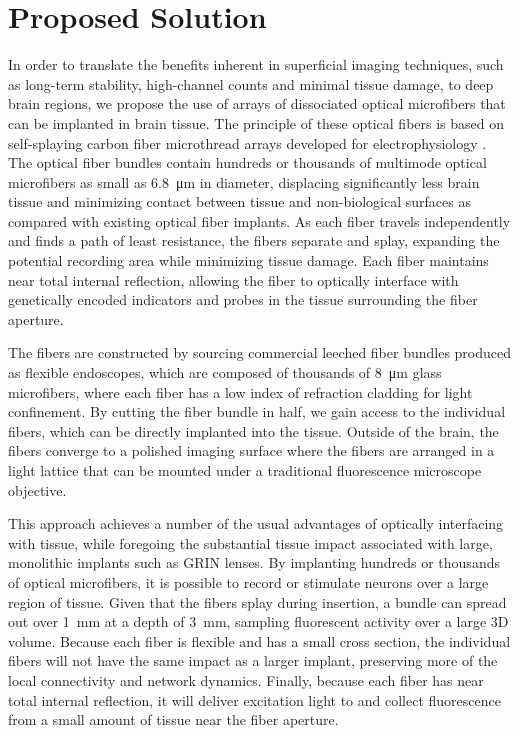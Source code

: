 \section{Proposed Solution}

In order to translate the benefits inherent in superficial 
imaging techniques, such as long-term stability, high-channel 
counts and minimal tissue damage, to deep brain regions, we 
propose the use of arrays of dissociated optical microfibers 
that can be implanted in brain tissue. The principle of these 
optical fibers is based on self-splaying carbon fiber microthread 
arrays developed for electrophysiology 
\cite{Guitchounts:2013bs,Markowitz:2015ko}. The optical fiber 
bundles contain hundreds or thousands of multimode 
optical microfibers as small as 6.8~\si{\micro\meter} in diameter, 
displacing significantly less brain tissue and minimizing 
contact between tissue and non-biological surfaces as 
compared with existing optical fiber implants. As each 
fiber travels independently and finds a path of least 
resistance, the fibers separate and splay, expanding 
the potential recording area while minimizing tissue 
damage. Each fiber maintains near total internal reflection, 
allowing the fiber to optically interface with genetically 
encoded indicators and probes in the tissue surrounding the 
fiber aperture.

The fibers are constructed by sourcing commercial leeched 
fiber bundles produced as flexible endoscopes, which are 
composed of thousands of 8~\si{\micro\meter} glass microfibers, 
where each fiber has a low index of refraction cladding for 
light confinement. By cutting the fiber bundle in half, we 
gain access to the individual fibers, which can be directly 
implanted into the tissue. Outside of the brain, the fibers 
converge to a polished imaging surface where the fibers are 
arranged in a light lattice that can be mounted under a 
traditional fluorescence microscope objective.

This approach achieves a number of the usual advantages 
of optically interfacing with tissue, while foregoing the 
substantial tissue impact associated with large, monolithic 
implants such as GRIN lenses. By implanting hundreds or 
thousands of optical microfibers, it is possible to record 
or stimulate neurons over a large region of tissue. Given 
that the fibers splay during insertion, a bundle can spread 
out over 1~mm at a depth of 3~mm, sampling fluorescent 
activity over a large 3D volume. Because 
each fiber is flexible and has a small cross section, the 
individual fibers will not have the same impact as a 
larger implant, preserving more of the local connectivity 
and network dynamics. Finally, because each fiber has 
near total internal reflection, it will deliver excitation 
light to and collect fluorescence from a small amount of 
tissue near the fiber aperture.

